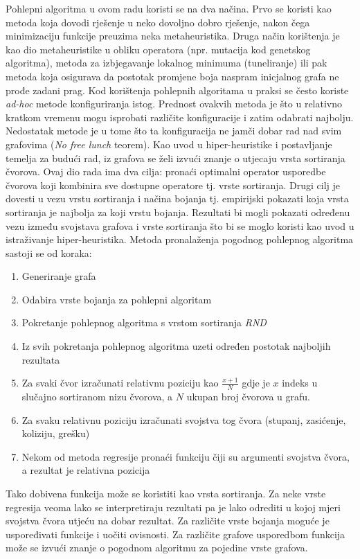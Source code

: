 \documentclass[times, utf8, diplomski, numeric]{fer}
\begin{document}
Pohlepni algoritma u ovom radu koristi se na dva načina. Prvo se koristi kao metoda koja dovodi rješenje u neko dovoljno dobro rješenje, nakon čega minimizaciju funkcije preuzima neka metaheuristika. Druga način korištenja je kao dio metaheuristike u obliku operatora (npr. mutacija kod genetskog algoritma), metoda za izbjegavanje lokalnog minimuma (tuneliranje) ili pak metoda koja osigurava da postotak promjene boja naspram inicjalnog grafa ne prođe zadani prag. Kod korištenja pohlepnih algoritama u praksi se često koriste \emph{ad-hoc} metode konfiguriranja istog. Prednost ovakvih metoda je što u relativno kratkom vremenu mogu isprobati različite konfiguracije i zatim odabrati najbolju. Nedostatak metode je u tome što ta konfiguracija ne jamči dobar rad nad svim grafovima (\emph{No free lunch} teorem). Kao uvod u hiper-heuristike i postavljanje temelja za budući rad, iz grafova se želi izvući znanje o utjecaju vrsta sortiranja čvorova. Ovaj dio rada ima dva cilja: pronaći optimalni operator usporedbe čvorova koji kombinira sve dostupne operatore tj. vrste sortiranja. Drugi cilj je dovesti u vezu vrstu sortiranja i načina bojanja tj. empirijski pokazati koja vrsta sortiranja je najbolja za koji vrstu bojanja. Rezultati bi mogli pokazati određenu vezu između svojstava grafova i vrste sortiranja što bi se moglo koristi kao uvod u istraživanje hiper-heuristika. Metoda pronalaženja pogodnog pohlepnog algoritma sastoji se od koraka:

\begin{enumerate}
	\item Generiranje grafa
	\item Odabira vrste bojanja za pohlepni algoritam
	\item Pokretanje pohlepnog algoritma s vrstom sortiranja \emph{RND}
	\item Iz svih pokretanja pohlepnog algoritma uzeti određen postotak najboljih rezultata
	\item Za svaki čvor izračunati relativnu poziciju kao $\frac{x+1}{N}$ gdje je $x$ indeks u slučajno sortiranom nizu čvorova, a $N$ ukupan broj čvorova u grafu. 
	\item Za svaku relativnu poziciju izračunati svojstva tog čvora (stupanj, zasićenje, koliziju, grešku)
	\item Nekom od metoda regresije pronaći funkciju čiji su argumenti svojstva čvora, a rezultat je relativna pozicija
\end{enumerate}

Tako dobivena funkcija može se koristiti kao vrsta sortiranja. Za neke vrste regresija veoma lako se interpretiraju rezultati pa je lako odrediti u kojoj mjeri svojstva čvora utjeću na dobar rezultat. Za različite vrste bojanja moguće je uspoređivati funkcije i uočiti ovisnosti. Za različite grafove usporedbom funkcija može se izvući znanje o pogodnom algoritmu za pojedine vrste grafova. 
\end{document}
